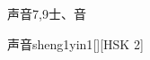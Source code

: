 \begin{entry}{声音}{7,9}{⼠、⾳}
  \begin{phonetics}{声音}{sheng1yin1}[][HSK 2]
  \end{phonetics}
\end{entry}
